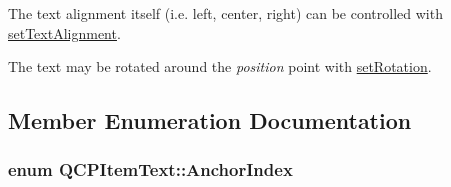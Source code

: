 The text alignment itself (i.\+e. left, center, right) can be controlled with \hyperlink{classQCPItemText_ab5bc0684c4d1bed81949a11b34dba478}{set\+Text\+Alignment}.

The text may be rotated around the {\itshape position} point with \hyperlink{classQCPItemText_a4bcc10cd97952c3f749d75824b5077f0}{set\+Rotation}. 

\subsection{Member Enumeration Documentation}
\subsubsection[{\texorpdfstring{Anchor\+Index}{AnchorIndex}}]{\setlength{\rightskip}{0pt plus 5cm}enum {\bf Q\+C\+P\+Item\+Text\+::\+Anchor\+Index}\hspace{0.3cm}{\ttfamily [protected]}}\hypertarget{classQCPItemText_a14a84e58f72519c8ae1d7a4a1dd23f21}{}\label{classQCPItemText_a14a84e58f72519c8ae1d7a4a1dd23f21}
